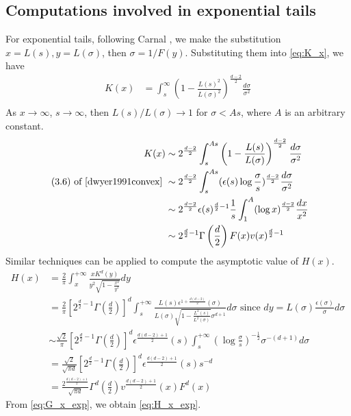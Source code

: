\documentclass{aptpub}
\begin{document}
\subsection{Computations involved in exponential tails}
For exponential tails, following Carnal \cite{carnal1970konvexe},
we make
the substitution $x=L(s), y=L(\sigma)$, then $\sigma=1/F(y)$.
Substituting them into \eqref{eq:K_x}, we have
\begin{align*}
    K(x)  & = \int_s^{\infty} \left(1-\frac{L(s)^2}{L(\sigma)^2} \right)^{\frac{d-2}{2}} \frac{d\sigma}{\sigma^2} \\
\end{align*}
As $x\to \infty$, $s\to \infty$,
then $L(s)/L(\sigma) \to 1$ for $\sigma <As$,
where $A$ is an arbitrary constant.
\begin{align*}
     K(x)& \sim 2^{\frac{d-2}{2}} 
     \int_s^{As} \left(1-\frac{L(s)}{L(\sigma)}\right)^{\frac{d-2}{2}}
     \frac{d\sigma}{\sigma^2} \\
     \textrm{ (3.6) of \cite{dwyer1991convex} }& 
     \sim  2^{\frac{d-2}{2}}  \int_s^{As} (\epsilon(s) \log\frac{\sigma}{s})^{\frac{d-2}{2}}\frac{d\sigma}{\sigma^2}\\
     &\sim 2^{\frac{d-2}{2}} \epsilon(s)^{\frac{d}{2}-1} \frac{1}{s} \int_1^{A} (\log x )^{\frac{d-2}{2}}\frac{dx}{x^2}\\
     & \sim 2^{\frac{d}{2}-1} \Gamma\left(\frac{d}{2}\right)F(x) v(x)^{\frac{d}{2}-1}    
\end{align*}
Similar techniques can be applied to compute the asymptotic value of $H(x)$.
\begin{align*}
    H(x) & = \frac{2}{\pi} \int_x^{+\infty}\frac{x K^d(y)}{y^2 \sqrt{1-\frac{x^2}{y^2}}}dy\\
    &=\frac{2}{\pi}\left[2^{\frac{d}{2}-1} \Gamma\left(\frac{d}{2}\right)\right]^d
    \int_s^{+\infty}\frac{L(s) \epsilon^{1+\frac{d(d-2)}{2}}(\sigma)}{L(\sigma) \sqrt{1-\frac{L^2(s)}{L^2(\sigma)}}\sigma^{d+1}} d\sigma
    \textrm{ since } dy=L(\sigma)\frac{\epsilon(\sigma)}{\sigma}d\sigma \\
    &\sim  \frac{\sqrt{2}}{\pi}
    \left[2^{\frac{d}{2}-1} \Gamma\left(\frac{d}{2}\right)\right]^d
    \epsilon^{\frac{d(d-2)+1}{2}}(s)
    \int_s^{+\infty} \left(\log\frac{\sigma}{s}
    \right)^{-\frac{1}{2}}
    \sigma^{-(d+1)}d\sigma \\
    &= \frac{\sqrt{2}}{\sqrt{\pi d}}\left[2^{\frac{d}{2}-1} \Gamma\left(\frac{d}{2}\right)\right]^d
    \epsilon^{\frac{d(d-2)+1}{2}}(s)s^{-d}\\
    &= \frac{2^{\frac{d(d-2)+1}{2}}}{\sqrt{\pi d}}\Gamma^d\left(\frac{d}{2}\right)
    v^{\frac{d(d-2)+1}{2}}(x)F^d(x)
\end{align*}
From \eqref{eq:G_x_exp}, we obtain \eqref{eq:H_x_exp}.
\end{document}
